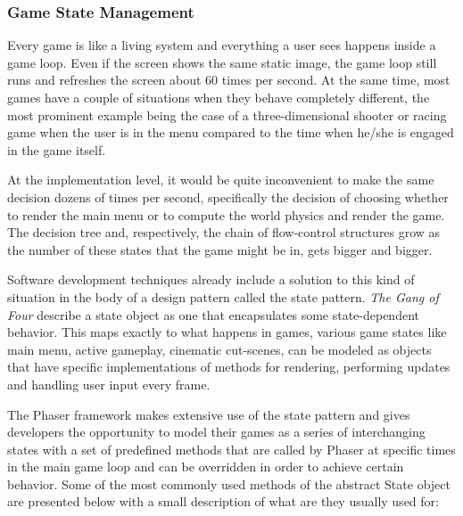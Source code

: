 \subsubsection{Game State Management}

Every game is like a living system and everything a user sees happens inside a
game loop. Even if the screen shows the same static image, the game loop still
runs and refreshes the screen about 60 times per second. At the same time, most
games have a couple of situations when they behave completely different, the
most prominent example being the case of a three-dimensional shooter or racing
game when the user is in the menu compared to the time when he/she is engaged in
the game itself.

At the implementation level, it would be quite inconvenient to make the same
decision dozens of times per second, specifically the decision of choosing
whether to render the main menu or to compute the world physics and render the
game. The decision tree and, respectively, the chain of flow-control structures
grow as the number of these states that the game might be in, gets bigger and
bigger.

Software development techniques already include a solution to this kind of
situation in the body of a design pattern called the state pattern. \emph{The
Gang of Four}\cite{gof} describe a state object as one that encapsulates some
state-dependent behavior. This maps exactly to what happens in games, various
game states like main menu, active gameplay, cinematic cut-scenes, can be
modeled as objects that have specific implementations of methods for
rendering, performing updates and handling user input every frame.

The Phaser framework makes extensive use of the state pattern and gives
developers the opportunity to model their games as a series of interchanging
states with a set of predefined methods that are called by Phaser at specific
times in the main game loop and can be overridden in order to achieve certain
behavior. Some of the most commonly used methods of the abstract State object
are presented below with a small description of what are they usually used for:


